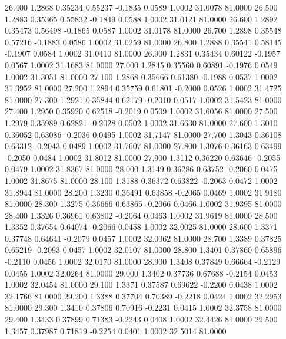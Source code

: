   26.400   1.2868   0.35234   0.55237  -0.1835   0.0589   1.0002  31.0078  81.0000
  26.500   1.2883   0.35365   0.55832  -0.1849   0.0588   1.0002  31.0121  81.0000
  26.600   1.2892   0.35473   0.56498  -0.1865   0.0587   1.0002  31.0178  81.0000
  26.700   1.2898   0.35548   0.57216  -0.1883   0.0586   1.0002  31.0259  81.0000
  26.800   1.2888   0.35541   0.58145  -0.1907   0.0584   1.0002  31.0410  81.0000
  26.900   1.2831   0.35434   0.60122  -0.1957   0.0567   1.0002  31.1683  81.0000
  27.000   1.2845   0.35560   0.60891  -0.1976   0.0549   1.0002  31.3051  81.0000
  27.100   1.2868   0.35666   0.61380  -0.1988   0.0537   1.0002  31.3952  81.0000
  27.200   1.2894   0.35759   0.61801  -0.2000   0.0526   1.0002  31.4725  81.0000
  27.300   1.2921   0.35844   0.62179  -0.2010   0.0517   1.0002  31.5423  81.0000
  27.400   1.2950   0.35920   0.62518  -0.2019   0.0509   1.0002  31.6056  81.0000
  27.500   1.2979   0.35989   0.62821  -0.2028   0.0502   1.0002  31.6630  81.0000
  27.600   1.3010   0.36052   0.63086  -0.2036   0.0495   1.0002  31.7147  81.0000
  27.700   1.3043   0.36108   0.63312  -0.2043   0.0489   1.0002  31.7607  81.0000
  27.800   1.3076   0.36163   0.63499  -0.2050   0.0484   1.0002  31.8012  81.0000
  27.900   1.3112   0.36220   0.63646  -0.2055   0.0479   1.0002  31.8367  81.0000
  28.000   1.3149   0.36286   0.63752  -0.2060   0.0475   1.0002  31.8675  81.0000
  28.100   1.3188   0.36372   0.63822  -0.2063   0.0472   1.0002  31.8944  81.0000
  28.200   1.3230   0.36491   0.63858  -0.2065   0.0469   1.0002  31.9180  81.0000
  28.300   1.3275   0.36666   0.63865  -0.2066   0.0466   1.0002  31.9395  81.0000
  28.400   1.3326   0.36961   0.63802  -0.2064   0.0463   1.0002  31.9619  81.0000
  28.500   1.3352   0.37654   0.64074  -0.2066   0.0458   1.0002  32.0025  81.0000
  28.600   1.3371   0.37748   0.64641  -0.2079   0.0457   1.0002  32.0062  81.0000
  28.700   1.3389   0.37825   0.65219  -0.2093   0.0457   1.0002  32.0107  81.0000
  28.800   1.3401   0.37860   0.65896  -0.2110   0.0456   1.0002  32.0170  81.0000
  28.900   1.3408   0.37849   0.66664  -0.2129   0.0455   1.0002  32.0264  81.0000
  29.000   1.3402   0.37736   0.67688  -0.2154   0.0453   1.0002  32.0454  81.0000
  29.100   1.3371   0.37587   0.69622  -0.2200   0.0438   1.0002  32.1766  81.0000
  29.200   1.3388   0.37704   0.70389  -0.2218   0.0424   1.0002  32.2953  81.0000
  29.300   1.3410   0.37806   0.70916  -0.2231   0.0415   1.0002  32.3758  81.0000
  29.400   1.3433   0.37899   0.71383  -0.2243   0.0408   1.0002  32.4426  81.0000
  29.500   1.3457   0.37987   0.71819  -0.2254   0.0401   1.0002  32.5014  81.0000
